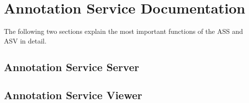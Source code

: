 \chapter{Annotation Service Documentation}

The following two sections explain the most important functions of the ASS and ASV in detail.

\section{Annotation Service Server}
\label{sec_B1}

\section{Annotation Service Viewer}
\label{sec_B2}